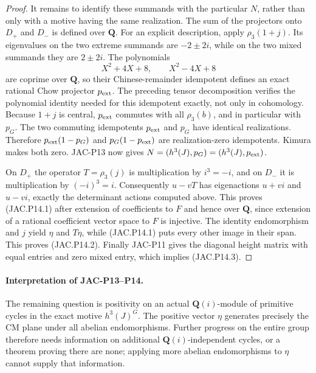 \documentclass[11pt,a4paper]{article}
\begin{document}
\begin{proof}
It remains to identify these summands with the particular $N$,
rather than only with a motive having the same realization.
The sum of the projectors onto $D_+$ and $D_-$ is defined over
$\mathbf Q$. For an explicit description, apply $\rho_3(1+j)$.
Its eigenvalues on the two extreme summands are $-2\pm2i$,
while on the two mixed summands they are $2\pm2i$.
The polynomials
\[
 X^2+4X+8,\qquad X^2-4X+8
\]
are coprime over $\mathbf Q$, so their Chinese-remainder
idempotent defines an exact rational Chow projector $p_{\rm ext}$.
The preceding tensor decomposition verifies the polynomial
identity needed for this idempotent exactly, not only in cohomology.
Because $1+j$ is central, $p_{\rm ext}$ commutes with all
$\rho_3(b)$, and in particular with $p_G$.
The two commuting idempotents $p_{\rm ext}$ and $p_G$ have
identical realizations. Therefore
$p_{\rm ext}(1-p_G)$ and $p_G(1-p_{\rm ext})$ are
realization-zero idempotents. Kimura makes both zero.
JAC-P13 now gives $N=(h^3(J),p_G)=(h^3(J),p_{\rm ext})$.

On $D_+$ the operator $T=\rho_3(j)$ is multiplication by
$i^3=-i$, and on $D_-$ it is multiplication by $(-i)^3=i$.
Consequently $u-vT$ has eigenactions $u+vi$ and $u-vi$,
exactly the determinant actions computed above. This proves
(JAC.P14.1) after extension of coefficients to $F$ and hence over
$\mathbf Q$, since extension of a rational coefficient vector
space to $F$ is injective.
The identity endomorphism and $j$ yield $\eta$ and $T\eta$,
while (JAC.P14.1) puts every other image in their span.
This proves (JAC.P14.2). Finally JAC-P11 gives the diagonal
height matrix with equal entries and zero mixed entry, which
implies (JAC.P14.3).
\end{proof}

\paragraph{Interpretation of JAC-P13--P14.}
The remaining question is positivity on an actual
$\mathbf Q(i)$-module of primitive cycles in the exact motive
$h^3(J)^G$. The positive vector $\eta$ generates precisely the
CM plane under all abelian endomorphisms. Further progress on
the entire group therefore needs information on additional
$\mathbf Q(i)$-independent cycles, or a theorem proving there
are none; applying more abelian endomorphisms to $\eta$ cannot
supply that information.


\end{document}

